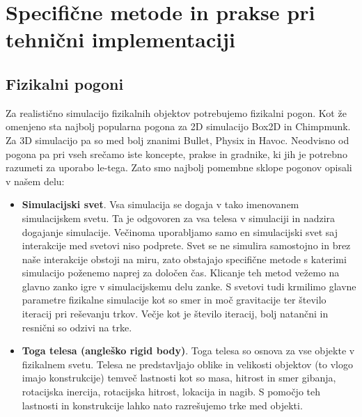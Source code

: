 \documentclass[12pt,a4paper,twoside]{book}
\begin{document}
\section{Specifične metode in prakse pri tehnični implementaciji}
\subsection{Fizikalni pogoni}
Za realistično simulacijo fizikalnih objektov potrebujemo fizikalni pogon. Kot že omenjeno sta najbolj popularna pogona za 2D simulacijo Box2D in Chimpmunk. Za 3D simulacijo pa so med bolj znanimi Bullet, Physix in Havoc. Neodvisno od pogona pa pri vseh srečamo iste koncepte, prakse in gradnike, ki jih je potrebno razumeti za uporabo le-tega. Zato smo najbolj pomembne sklope pogonov opisali v našem delu:
\begin{itemize}
	\item \textbf{Simulacijski svet}.  Vsa simulacija se dogaja v tako imenovanem simulacijskem svetu. Ta je odgovoren za vsa telesa v simulaciji in nadzira dogajanje simulacije. Večinoma uporabljamo samo en simulacijski svet saj interakcije med svetovi niso podprete. Svet se ne simulira samostojno in brez naše interakcije obstoji na miru, zato obstajajo specifične metode s katerimi simulacijo poženemo naprej za določen čas. Klicanje teh metod vežemo na glavno zanko igre v simulacijskemu delu zanke. S svetovi tudi krmilimo glavne parametre fizikalne simulacije kot so smer in moč gravitacije ter število iteracij pri reševanju trkov. Večje kot je število iteracij, bolj natančni in resnični so odzivi na trke.
	\item \textbf{Toga telesa (angleško rigid body)}. Toga telesa so osnova za vse objekte v fizikalnem svetu. Telesa ne predstavljajo oblike in velikosti objektov (to vlogo imajo konstrukcije) temveč lastnosti kot so  masa, hitrost  in smer gibanja, rotacijska inercija, rotacijska hitrost, lokacija in nagib. S pomočjo teh lastnosti in konstrukcije lahko nato razrešujemo trke med objekti.
	

\end{itemize}
\end{document}
